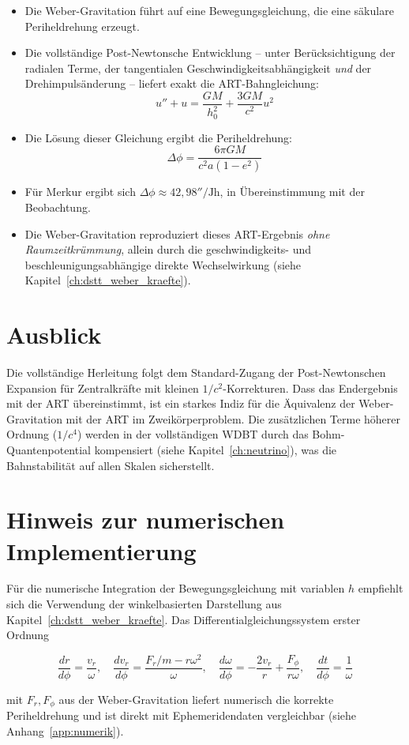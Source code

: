 \begin{itemize}
    \item Die Weber-Gravitation führt auf eine Bewegungsgleichung, die eine säkulare Periheldrehung erzeugt.
    \item Die vollständige Post-Newtonsche Entwicklung – unter Berücksichtigung der radialen Terme, der tangentialen Geschwindigkeitsabhängigkeit \emph{und} der Drehimpulsänderung – liefert exakt die ART-Bahngleichung:
          \[
          u'' + u = \frac{GM}{h_0^2} + \frac{3GM}{c^2} u^2
          \]
    \item Die Lösung dieser Gleichung ergibt die Periheldrehung:
          \[
          \Delta\phi = \frac{6\pi GM}{c^2 a(1-e^2)}
          \]
    \item Für Merkur ergibt sich \( \Delta\phi \approx 42,98''/\text{Jh} \), in Übereinstimmung mit der Beobachtung.
    \item Die Weber-Gravitation reproduziert dieses ART-Ergebnis \emph{ohne Raumzeitkrümmung}, allein durch die geschwindigkeits- und beschleunigungsabhängige direkte Wechselwirkung (siehe Kapitel~\ref{ch:dstt_weber_kraefte}).
\end{itemize}

\section{Ausblick}
\label{app:periheldrehung_ausblick}

Die vollständige Herleitung folgt dem Standard-Zugang der Post-Newtonschen Expansion für Zentralkräfte mit kleinen \( 1/c^2 \)-Korrekturen. Dass das Endergebnis mit der ART übereinstimmt, ist ein starkes Indiz für die Äquivalenz der Weber-Gravitation mit der ART im Zweikörperproblem. Die zusätzlichen Terme höherer Ordnung (\( 1/c^4 \)) werden in der vollständigen WDBT durch das Bohm-Quantenpotential kompensiert (siehe Kapitel~\ref{ch:neutrino}), was die Bahnstabilität auf allen Skalen sicherstellt.

\section*{Hinweis zur numerischen Implementierung}

Für die numerische Integration der Bewegungsgleichung mit variablen \( h \) empfiehlt sich die Verwendung der winkelbasierten Darstellung aus Kapitel~\ref{ch:dstt_weber_kraefte}. Das Differentialgleichungssystem erster Ordnung

\[
\frac{dr}{d\phi} = \frac{v_r}{\omega}, \quad
\frac{dv_r}{d\phi} = \frac{F_r/m - r\omega^2}{\omega}, \quad
\frac{d\omega}{d\phi} = -\frac{2v_r}{r} + \frac{F_\phi}{r\omega}, \quad
\frac{dt}{d\phi} = \frac{1}{\omega}
\]

mit \( F_r, F_\phi \) aus der Weber-Gravitation liefert numerisch die korrekte Periheldrehung und ist direkt mit Ephemeridendaten vergleichbar (siehe Anhang~\ref{app:numerik}).